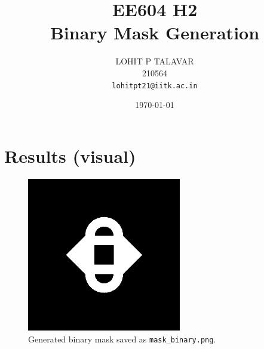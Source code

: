 \documentclass[11pt,a4paper]{article}
\title{EE604 H2 \\ Binary Mask Generation}
\author{LOHIT P TALAVAR \\ 210564 \\ \texttt{lohitpt21@iitk.ac.in}}
\date{\today}
\begin{document}
\maketitle
\tableofcontents
\clearpage


\clearpage
\section{Results (visual)}
\begin{figure}[H]
  \centering
  \includegraphics[width=0.6\textwidth]{mask_binary.png}
  \caption{Generated binary mask saved as \texttt{mask\_binary.png}.}
  \label{fig:mask}
\end{figure}


\clearpage
\end{document}
